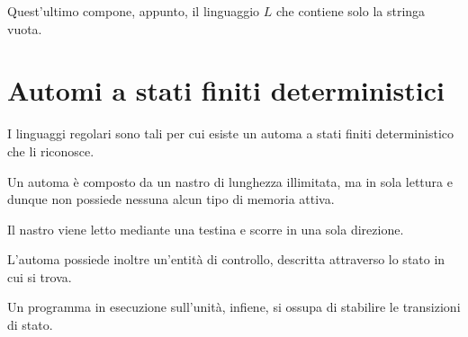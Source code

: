\documentclass[a4paper, 12pt]{book}
\begin{document}
    Quest'ultimo compone, appunto, il linguaggio $L$ che contiene solo la stringa vuota.

    \section*{Automi a stati finiti deterministici}
    I linguaggi regolari sono tali per cui esiste un automa a stati finiti deterministico che li riconosce.

    Un automa è composto da un nastro di lunghezza illimitata, ma in sola lettura e dunque non possiede nessuna alcun tipo di memoria attiva.

    Il nastro viene letto mediante una testina e scorre in una sola direzione.

    L'automa possiede inoltre un'entità di controllo, descritta attraverso lo stato in cui si trova.

    Un programma in esecuzione sull'unità, infiene, si ossupa di stabilire le transizioni di stato.
\end{document}
